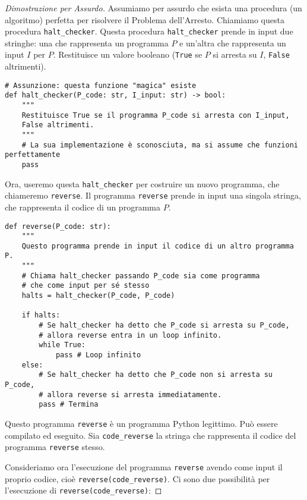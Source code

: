 \documentclass[a4paper]{article}
\theoremstyle{definition} %
\begin{document}
\begin{proof}[Dimostrazione per Assurdo]
Assumiamo per assurdo che esista una procedura (un algoritmo) perfetta per risolvere il Problema dell'Arresto. Chiamiamo questa procedura \texttt{halt\_checker}.
Questa procedura \texttt{halt\_checker} prende in input due stringhe: una che rappresenta un programma $P$ e un'altra che rappresenta un input $I$ per $P$. Restituisce un valore booleano (\texttt{True} se $P$ si arresta su $I$, \texttt{False} altrimenti).

\begin{verbatim}
# Assunzione: questa funzione "magica" esiste
def halt_checker(P_code: str, I_input: str) -> bool:
    """
    Restituisce True se il programma P_code si arresta con I_input,
    False altrimenti.
    """
    # La sua implementazione è sconosciuta, ma si assume che funzioni perfettamente
    pass
\end{verbatim}

Ora, useremo questa \texttt{halt\_checker} per costruire un nuovo programma, che chiameremo \texttt{reverse}. Il programma \texttt{reverse} prende in input una singola stringa, che rappresenta il codice di un programma $P$.

\begin{verbatim}
def reverse(P_code: str):
    """
    Questo programma prende in input il codice di un altro programma P.
    """
    # Chiama halt_checker passando P_code sia come programma
    # che come input per sé stesso
    halts = halt_checker(P_code, P_code)

    if halts:
        # Se halt_checker ha detto che P_code si arresta su P_code,
        # allora reverse entra in un loop infinito.
        while True:
            pass # Loop infinito
    else:
        # Se halt_checker ha detto che P_code non si arresta su P_code,
        # allora reverse si arresta immediatamente.
        pass # Termina
\end{verbatim}

Questo programma \texttt{reverse} è un programma Python legittimo. Può essere compilato ed eseguito.
Sia \texttt{code\_reverse} la stringa che rappresenta il codice del programma \texttt{reverse} stesso.

Consideriamo ora l'esecuzione del programma \texttt{reverse} avendo come input il proprio codice, cioè \texttt{reverse(code\_reverse)}.
Ci sono due possibilità per l'esecuzione di \texttt{reverse(code\_reverse)}:


\end{proof}
\end{document}
